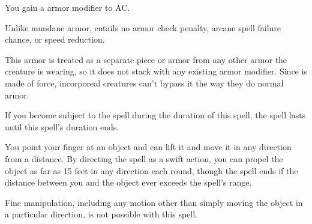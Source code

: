 \begin{spelleffect}
  You gain a  armor modifier to AC. \bonusscalingdescription
  \par Unlike mundane armor,  entails no armor check penalty, arcane spell failure chance, or speed reduction.
\end{spelleffect}
\begin{spellnotes}
  This armor is treated as a separate piece or armor from any other armor the creature is wearing, so it does not stack with any existing armor modifier. Since  is made of force, incorporeal creatures can't bypass it the way they do normal armor.
  
  If you become subject to the  spell during the duration of this spell, the  spell lasts until this spell's duration ends.
\end{spellnotes}

\spellrng{\rngclose}
\spelldur{\durshort}
\begin{spelleffect}
  You point your finger at an object and can lift it and move it in any direction from a distance. By directing the spell as a swift action, you can propel the object as far as 15 feet in any direction each round, though the spell ends if the distance between you and the object ever exceeds the spell's range.
\end{spelleffect}
\begin{spellnotes}
  Fine manipulation, including any motion other than simply moving the object in a particular direction, is not possible with this spell.
\end{spellnotes}

